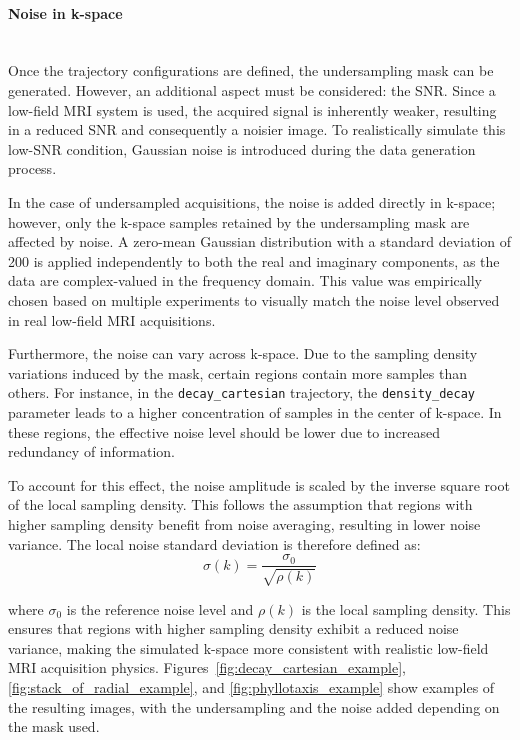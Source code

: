 \documentclass[12pt]{article}
\begin{document}
\paragraph{Noise in k-space}
\mbox{}\\

Once the trajectory configurations are defined, the undersampling mask can be generated. 
However, an additional aspect must be considered: the SNR.
Since a low-field MRI system is used, the acquired signal is inherently weaker, resulting in a reduced SNR and consequently a noisier image. 
To realistically simulate this low-SNR condition, Gaussian noise is introduced during the data generation process.
\vspace{0.5cm}

In the case of undersampled acquisitions, the noise is added directly in k-space; however, only the k-space samples retained by the undersampling mask are affected by noise.
A zero-mean Gaussian distribution with a standard deviation of 200 is applied independently to both the real and imaginary components, as the data are complex-valued in the frequency domain. 
This value was empirically chosen based on multiple experiments to visually match the noise level observed in real low-field MRI acquisitions.
\vspace{0.5cm}

Furthermore, the noise can vary across k-space.
Due to the sampling density variations induced by the mask, certain regions contain more samples than others. 
For instance, in the \texttt{decay\_cartesian} trajectory, the \texttt{density\_decay} parameter leads to a higher concentration of samples in the center of k-space. 
In these regions, the effective noise level should be lower due to increased redundancy of information.
\vspace{0.5cm}

To account for this effect, the noise amplitude is scaled by the inverse square root of the local sampling density. 
This follows the assumption that regions with higher sampling density benefit from noise averaging, resulting in lower noise variance.
The local noise standard deviation is therefore defined as:
\[
\sigma(k)=\frac{\sigma_0}{\sqrt{\rho(k)}}
\]

where $\sigma_0$ is the reference noise level and $\rho(k)$ is the local sampling density.
This ensures that regions with higher sampling density exhibit a reduced noise variance, making the simulated k-space more consistent with realistic low-field MRI acquisition physics.
Figures~\ref{fig:decay_cartesian_example}, \ref{fig:stack_of_radial_example}, and \ref{fig:phyllotaxis_example} show examples of the resulting images, with the undersampling and the noise added depending on the mask used.
\end{document}
